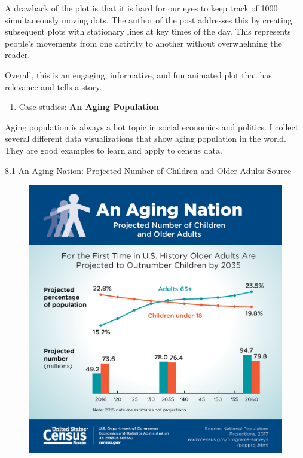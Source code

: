 \documentclass[]{book}
\providecommand{\tightlist}{%
  \setlength{\itemsep}{0pt}\setlength{\parskip}{0pt}}
\theoremstyle{definition}
\theoremstyle{definition}
\theoremstyle{definition}
\theoremstyle{remark}
\begin{document}
A drawback of the plot is that it is hard for our eyes to keep track of
1000 simultaneously moving dots. The author of the post addresses this
by creating subsequent plots with stationary lines at key times of the
day. This represents people's movements from one activity to another
without overwhelming the reader.

Overall, this is an engaging, informative, and fun animated plot that
has relevance and tells a story.

\begin{enumerate}
\def\labelenumi{\arabic{enumi}.}
\setcounter{enumi}{7}
\tightlist
\item
  Case studies: \textbf{An Aging Population}
\end{enumerate}

Aging population is always a hot topic in social economics and politics.
I collect several different data visualizations that show aging
population in the world. They are good examples to learn and apply to
census data.

8.1 An Aging Nation: Projected Number of Children and Older Adults
\href{https://www.census.gov/library/visualizations/2018/comm/historic-first.html}{Source}

\begin{figure}
\centering
\includegraphics{images/aging_nation.jpg}
\caption{}
\end{figure}
\end{document}
